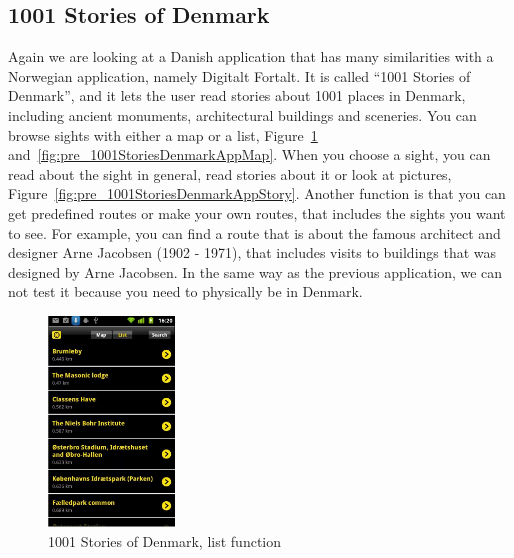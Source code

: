 \documentclass[11pt]{book}
\begin{document}
\subsection{1001 Stories of Denmark}
Again we are looking at a Danish application that has many similarities with a Norwegian application, namely Digitalt Fortalt. It is called ``1001 Stories of Denmark'', and it lets the user read stories about 1001 places in Denmark, including ancient monuments, architectural buildings and sceneries. You can browse sights with either a map or a list, Figure~\ref{fig:pre_1001StoriesDenmarkAppList} and~\ref{fig:pre_1001StoriesDenmarkAppMap}. When you choose a sight, you can read about the sight in general, read stories about it or look at pictures, Figure~\ref{fig:pre_1001StoriesDenmarkAppStory}. Another function is that you can get predefined routes or make your own routes, that includes the sights you want to see. For example, you can find a route that is about the famous architect and designer Arne Jacobsen (1902 - 1971), that includes visits to buildings that was designed by Arne Jacobsen. In the same way as the previous application, we can not test it because you need to physically be in Denmark.

\begin{figure}[H]
      \centering
      \includegraphics[width=0.3\textwidth]{Figures/Prestudy/1001storiesList.png}
      \caption{1001 Stories of Denmark, list function}
      \label{fig:pre_1001StoriesDenmarkAppList}
\end{figure}
\end{document}
